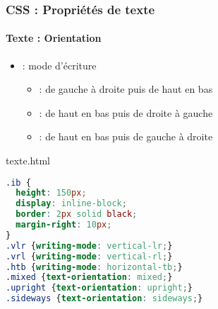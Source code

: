 \documentclass[xcolor=table]{beamer}
\begin{document}
\begin{frame}[fragile]
\frametitle{CSS : Propriétés de texte}
\framesubtitle{Texte : Orientation}

\begin{minipage}{0.60\textwidth}
	\begin{itemize}
		\item {} : mode d'écriture
		\begin{itemize}
			\item {} : de gauche à droite puis de haut en bas
			\item {} : de haut en bas puis de droite à gauche
			\item {} : de haut en bas puis de gauche à droite
		\end{itemize}
	\end{itemize}
\end{minipage}
%
\begin{minipage}{0.38\textwidth}
	\begin{exampleblock}{texte.html}
		\lstset{escapeinside=**}
\tiny\bfseries\vspace{-6pt}
\begin{lstlisting}[language={CSS}]
.ib {
  height: 150px;
  display: inline-block;
  border: 2px solid black;
  margin-right: 10px;
}
.vlr {writing-mode: vertical-lr;}
.vrl {writing-mode: vertical-rl;}
.htb {writing-mode: horizontal-tb;}
.mixed {text-orientation: mixed;}
.upright {text-orientation: upright;}
.sideways {text-orientation: sideways;}
\end{lstlisting}\vspace{-6pt}
	\end{exampleblock}
\end{minipage}
\begin{itemize}

\end{itemize}
\end{frame}
\end{document}

